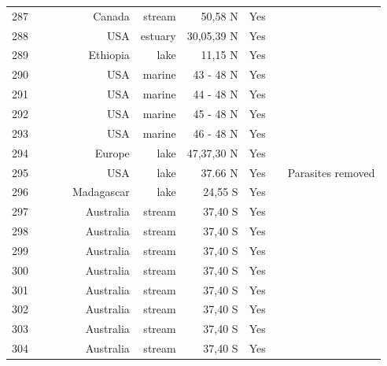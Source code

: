 \documentclass[12pt]{article}
\begin{document}
\begin{landscape}
\begin{table}[h!]
\begin{tabular}{rrrrrrrrr}
      287   & ~\citet{GlobalWeb} & ~\citet{Cromar1996} & Canada & stream & 50,58 N & Yes   &       &  \\
      288   & ~\citet{GlobalWeb} & ~\citet{Christian1999} & USA   & estuary & 30,05,39 N & Yes   &       &  \\
      289   & ~\citet{GlobalWeb} & ~\citet{Fetahi2011} & Ethiopia & lake  & 11,15 N & Yes   &       &  \\
      290   & ~\citet{GlobalWeb} & ~\citet{Brodeur1992} & USA   & marine & 43 - 48 N & Yes   &       &  \\
      291   & ~\citet{GlobalWeb} & ~\citet{Brodeur1992} & USA   & marine & 44 - 48 N & Yes   &       &  \\
      292   & ~\citet{GlobalWeb} & ~\citet{Brodeur1992} & USA   & marine & 45 - 48 N & Yes   &       &  \\
      293   & ~\citet{GlobalWeb} & ~\citet{Brodeur1992} & USA   & marine & 46 - 48 N & Yes   &       &  \\
      294   & ~\citet{GlobalWeb} & ~\citet{Gaedke1994} & Europe & lake  & 47,37,30 N & Yes   &       &  \\
      295   & ~\citet{GlobalWeb} & ~\citet{Preston2012} & USA   & lake  & 37.66 N & Yes   &       & Parasites removed \\
      296   & ~\citet{GlobalWeb} & ~\citet{Ratsirarson1996} & Madagascar & lake  & 24,55 S & Yes   &       &  \\
      297   & ~\citet{GlobalWeb} & ~\citet{Closs1994} & Australia & stream & 37,40 S & Yes   &       &  \\
      298   & ~\citet{GlobalWeb} & ~\citet{Closs1994} & Australia & stream & 37,40 S & Yes   &       &  \\
      299   & ~\citet{GlobalWeb} & ~\citet{Closs1994} & Australia & stream & 37,40 S & Yes   &       &  \\
      300   & ~\citet{GlobalWeb} & ~\citet{Closs1994} & Australia & stream & 37,40 S & Yes   &       &  \\
      301   & ~\citet{GlobalWeb} & ~\citet{Closs1994} & Australia & stream & 37,40 S & Yes   &       &  \\
      302   & ~\citet{GlobalWeb} & ~\citet{Closs1994} & Australia & stream & 37,40 S & Yes   &       &  \\
      303   & ~\citet{GlobalWeb} & ~\citet{Closs1994} & Australia & stream & 37,40 S & Yes   &       &  \\
      304   & ~\citet{GlobalWeb} & ~\citet{Closs1994} & Australia & stream & 37,40 S & Yes   &       &  \\

\end{tabular}
\end{table}
\end{landscape}
\end{document}
